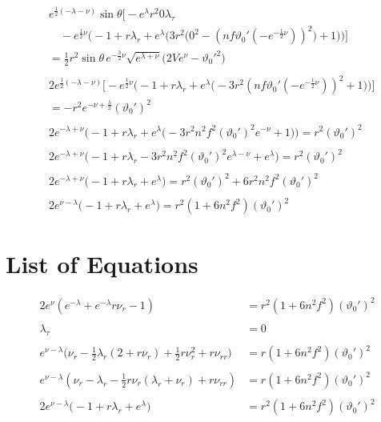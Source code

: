 \documentclass[12pt]{article}
\begin{document}
\begin{align}
&e^{\frac{1}{2}(-\lambda-\nu)}\sin\theta\Big[
 -e^{\lambda} r^2 0 \lambda_\tau \nonumber \\
 & \quad - e^{\frac{1}{2}\nu}\Big(
    -1 + r \lambda_r
    + e^{\lambda}\Big(3 r^2\big(0^2 - (n f \vartheta_0' (-e^{-\frac{1}{2}\nu}))^2\big) + 1\Big)
   \Big)
\Big] \nonumber\\
&= \frac{1}{2} r^2 \sin\theta\, e^{-\frac{3}{2}\nu} \sqrt{e^{\lambda+\nu}}\Big(2 V e^{\nu} - \vartheta_0'^2\Big) \nonumber \\ \nonumber \\
&2e^{\frac{1}{2}(-\lambda-\nu)} \Big[
 - e^{\frac{1}{2}\nu}\Big(
    -1 + r \lambda_r
    + e^{\lambda}\Big(-3 r^2(n f \vartheta_0' (-e^{-\frac{1}{2}\nu}))^2 + 1\Big)
   \Big)
\Big] \nonumber\\
&= -r^2 e^{-\nu + \frac{\lambda}{2}} (\vartheta_0')^2 \nonumber \\ \nonumber \\
&2e^{-\lambda + \nu}\Big(
    -1 + r \lambda_r
    + e^{\lambda}\Big(-3 r^2 n^2 f^2 (\vartheta_0')^2 e^{-\nu} + 1\Big)
   \Big) = r^2 (\vartheta_0')^2 \nonumber \\ \nonumber \\
&2e^{-\lambda + \nu}\Big(
  -1 + r \lambda_r -3 r^2 n^2 f^2 (\vartheta_0')^2 e^{\lambda-\nu} + e^{\lambda} \Big) = r^2 (\vartheta_0')^2 \nonumber \\ \nonumber \\
&2e^{-\lambda + \nu}\Big(
  -1 + r \lambda_r + e^{\lambda} \Big) = r^2 (\vartheta_0')^2 + 6 r^2 n^2 f^2 (\vartheta_0')^2 \nonumber \\ \nonumber \\
&2e^{\nu-\lambda}\Big(
  -1 + r \lambda_r + e^{\lambda} \Big) = r^2 (1 + 6 n^2 f^2) (\vartheta_0')^2
\end{align}

\section*{List of Equations}

\begin{align}
  2e^{\nu} \left(e^{-\lambda} + e^{-\lambda}r \nu_r - 1\right) &= r^2(1 + 6 n^2 f^2)(\vartheta_0')^2 \\ \nonumber \\
  \lambda_\tau &= 0 \\ \nonumber \\
  e^{\nu-\lambda} \big(\nu_r - \frac{1}{2} \lambda_r (2 + r \nu_r) + \frac{1}{2}r\nu_r^2 + r\nu_{rr} \big) &= r (1 + 6 n^2 f^2) (\vartheta_0')^2 \\ \nonumber \\
  e^{\nu-\lambda} \left(\nu_r - \lambda_r - \frac{1}{2} r \nu_r \left( \lambda_r + \nu_r \right) + r \nu_{rr} \right) &= r(1 + 6 n^2 f^2 ) (\vartheta_0')^2 \\ \nonumber \\
  2e^{\nu-\lambda}\Big(
  -1 + r \lambda_r + e^{\lambda} \Big) &= r^2 (1 + 6 n^2 f^2) (\vartheta_0')^2
\end{align}
\end{document}
